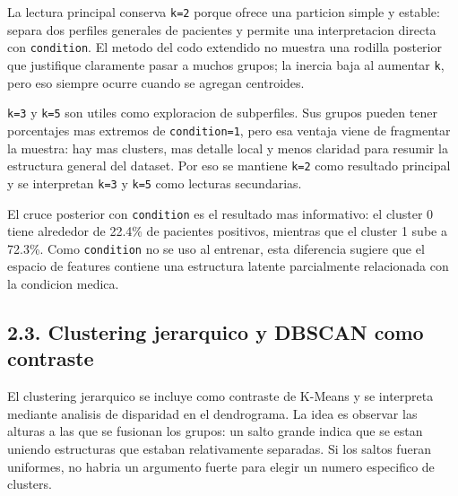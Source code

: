 \documentclass[11pt]{article}
\begin{document}
    \begin{center}
    \end{center}
    { \hspace*{\fill} \\}
    
    \begin{center}
    \end{center}
    { \hspace*{\fill} \\}
    
    La lectura principal conserva \texttt{k=2} porque ofrece una particion
simple y estable: separa dos perfiles generales de pacientes y permite
una interpretacion directa con \texttt{condition}. El metodo del codo
extendido no muestra una rodilla posterior que justifique claramente
pasar a muchos grupos; la inercia baja al aumentar \texttt{k}, pero eso
siempre ocurre cuando se agregan centroides.

\texttt{k=3} y \texttt{k=5} son utiles como exploracion de subperfiles.
Sus grupos pueden tener porcentajes mas extremos de
\texttt{condition=1}, pero esa ventaja viene de fragmentar la muestra:
hay mas clusters, mas detalle local y menos claridad para resumir la
estructura general del dataset. Por eso se mantiene \texttt{k=2} como
resultado principal y se interpretan \texttt{k=3} y \texttt{k=5} como
lecturas secundarias.

El cruce posterior con \texttt{condition} es el resultado mas
informativo: el cluster 0 tiene alrededor de 22.4\% de pacientes
positivos, mientras que el cluster 1 sube a 72.3\%. Como
\texttt{condition} no se uso al entrenar, esta diferencia sugiere que el
espacio de features contiene una estructura latente parcialmente
relacionada con la condicion medica.

    \subsection{2.3. Clustering jerarquico y DBSCAN como
contraste}\label{clustering-jerarquico-y-dbscan-como-contraste}

El clustering jerarquico se incluye como contraste de K-Means y se
interpreta mediante analisis de disparidad en el dendrograma. La idea es
observar las alturas a las que se fusionan los grupos: un salto grande
indica que se estan uniendo estructuras que estaban relativamente
separadas. Si los saltos fueran uniformes, no habria un argumento fuerte
para elegir un numero especifico de clusters.
\end{document}
